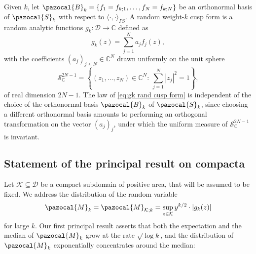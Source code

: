 \documentclass[12pt, a4paper]{amsart}
\theoremstyle{definition}
\newcommand {\1} {\mathbf{1}}
\newcommand {\C} {\mathbb {C}}
\newcommand {\M} {\pazocal {M}}
\newcommand {\Dc} {\mathcal{D}}
\newcommand {\Kc} {\mathcal{K}}
\newcommand {\Bc} {\pazocal {B}}
\newcommand{\Sc}{{\pazocal{S}}}
\newcommand{\Scc}{{\mathcal{S}}}
\numberwithin{equation}{section}
\begin{document}
Given $k$, let $\Bc_{k}=\{f_{1}=f_{k;1},\ldots, f_{N}=f_{k;N}\}$ be an orthonormal basis of $\Sc_{k}$ with respect to $\langle\cdot,\cdot\rangle_{PS}$. A random weight-$k$ cusp form is a random analytic functions $g_{k}:\Dc\rightarrow \C$
defined as
\begin{equation}
\label{eq:gk rand cusp form}
g_{k}(z) = \sum\limits_{j=1}^{N}a_{j}f_{j}(z),
\end{equation}
with the coefficients $(a_{j})_{j\le N} \in\C^{N}$ drawn uniformly on the unit sphere
\begin{equation}
\label{eq:sphere 2N-1}
\Scc^{2N-1}_{\C} = \left\{(z_{1},\ldots,z_{N})\in\C^{N}:\: \sum\limits_{j=1}^{N}|z_{j}|^{2} = 1 \right\},
\end{equation}
of real dimension $2N-1$. The law of
\eqref{eq:gk rand cusp form}
is independent of the choice of the orthonormal basis $\Bc_{k}$ of $\Sc_{k}$, since choosing a different orthonormal basis amounts to performing an orthogonal transformation on
the vector $(a_{j})_{j}$, under which the uniform measure of $\Scc^{2N-1}_{\C}$ is invariant.

\subsection{Statement of the principal result on compacta}

Let $\Kc\subseteq\Dc$ be a compact subdomain of positive area, that will be assumed to be fixed. We address the distribution of the random variable
\begin{equation}
\label{eq:Mk def sup}
\M_{k}=\M_{\Kc;k} = \sup\limits_{z\in\Kc}y^{k/2}\cdot \left|g_{k}(z)\right|
\end{equation}
for large $k$.
Our first principal result asserts that both the expectation and the median of $\M_{k}$ grow at the rate $\sqrt{\log{k}}$, and the distribution of $\M_{k}$ exponentially concentrates around the median:
\end{document}
